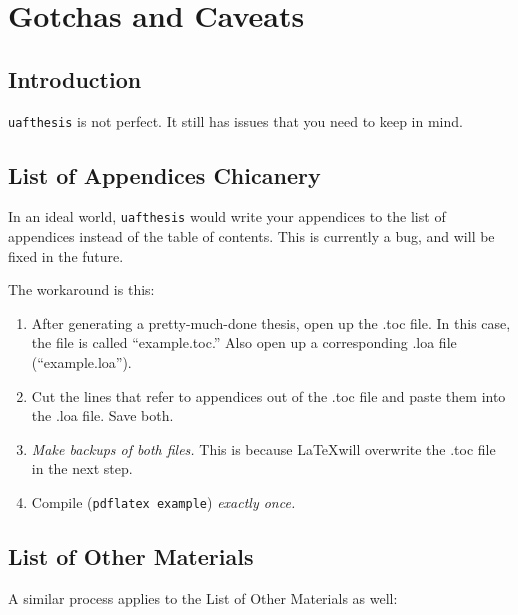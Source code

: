 \chapter{Gotchas and Caveats}

\section{Introduction}

\texttt{uafthesis} is not perfect. It still has issues that you need to keep
in mind.

\section{List of Appendices Chicanery}

In an ideal world, \texttt{uafthesis} would write your appendices to the
list of appendices instead of the table of contents. This is currently a bug,
and will be fixed in the future.

The workaround is this:

\begin{enumerate}
\item After generating a pretty-much-done thesis, open up the .toc file. In
this case, the file is called ``example.toc.'' Also open up a corresponding
.loa file (``example.loa'').
\item Cut the lines that refer to appendices out of the .toc file and paste
them into the .loa file. Save both.
\item \emph{Make backups of both files.} This is because \LaTeX will overwrite
the .toc file in the next step.
\item Compile (\texttt{pdflatex example}) \emph{exactly once.}
\end{enumerate}

\section{List of Other Materials}

A similar process applies to the List of Other Materials as well:

